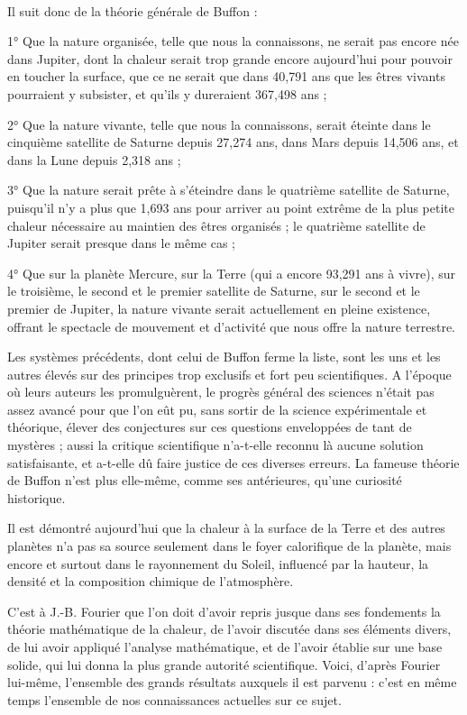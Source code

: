 \documentclass[a4paper, 11pt, oneside]{article}
\begin{document}
\paragraph{}
Il suit donc de la théorie générale de Buffon :

1° Que la nature organisée, telle que nous la connaissons, ne serait pas encore née dans Jupiter, dont la chaleur serait trop grande encore aujourd'hui pour pouvoir en toucher la surface, que ce ne serait que dans 40,791 ans que les êtres vivants pourraient y subsister, et qu'ils y dureraient 367,498 ans ;

2° Que la nature vivante, telle que nous la connaissons, serait éteinte dans le cinquième satellite de Saturne depuis 27,274 ans, dans Mars depuis 14,506 ans, et dans la Lune depuis 2,318 ans ;

3° Que la nature serait prête à s'éteindre dans le quatrième satellite de Saturne, puisqu'il n'y a plus que 1,693 ans pour arriver au point extrême de la plus petite chaleur nécessaire au maintien des êtres organisés ; le quatrième satellite de Jupiter serait presque dans le même cas ;

4° Que sur la planète Mercure, sur la Terre (qui a encore 93,291 ans à vivre), sur le troisième, le second et le premier satellite de Saturne, sur le second et le premier de Jupiter, la nature vivante serait actuellement en pleine existence, offrant le spectacle de mouvement et d'activité que nous offre la nature terrestre.

Les systèmes précédents, dont celui de Buffon ferme la liste, sont les uns et les autres élevés sur des principes trop exclusifs et fort peu scientifiques. A l'époque où leurs auteurs les promulguèrent, le progrès général des sciences n'était pas assez avancé pour que l'on eût pu, sans sortir de la science expérimentale et théorique, élever des conjectures sur ces questions enveloppées de tant de mystères ; aussi la critique scientifique n'a-t-elle reconnu là aucune solution satisfaisante, et a-t-elle dû faire justice de ces diverses erreurs. La fameuse théorie de Buffon n'est plus elle-même, comme ses antérieures, qu'une curiosité historique.

Il est démontré aujourd'hui que la chaleur à la surface de la Terre et des autres planètes n'a pas sa source seulement dans le foyer calorifique de la planète, mais encore et surtout dans le rayonnement du Soleil, influencé par la hauteur, la densité et la composition chimique de l'atmosphère.

C'est à J.-B. Fourier que l'on doit d'avoir repris jusque dans ses fondements la théorie mathématique de la chaleur, de l'avoir discutée dans ses éléments divers, de lui avoir appliqué l'analyse mathématique, et de l'avoir établie sur une base solide, qui lui donna la plus grande autorité scientifique. Voici, d'après Fourier lui-même, l'ensemble des grands résultats auxquels il est parvenu : c'est en même temps l'ensemble de nos connaissances actuelles sur ce sujet.
\end{document}
